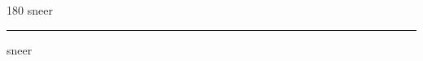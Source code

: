 
\begin{frame}
\begin{center}
\begin{turn}{180}
{\fontsize{2.5cm}{1em}\selectfont sneer}
\end{turn}
\vspace{1em}\par  
\hrule
\vspace{1em}\par  
{\fontsize{2.5cm}{1em}\selectfont sneer}
\end{center}
\end{frame}

